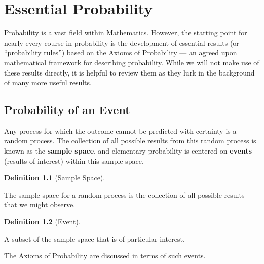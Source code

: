 \documentclass[
  letterpaper,
  DIV=11,
  numbers=noendperiod]{scrreprt}
\theoremstyle{plain}
\theoremstyle{definition}
\newtheorem{definition}{Definition}[chapter]
\theoremstyle{definition}
\theoremstyle{remark}
\begin{document}

\hypertarget{sec-fundamentals}{%
\chapter{Essential Probability}\label{sec-fundamentals}}

Probability is a vast field within Mathematics. However, the starting
point for nearly every course in probability is the development of
essential results (or ``probability rules'') based on the Axioms of
Probability --- an agreed upon mathematical framework for describing
probability. While we will not make use of these results directly, it is
helpful to review them as they lurk in the background of many more
useful results.

\hypertarget{probability-of-an-event}{%
\section{Probability of an Event}\label{probability-of-an-event}}

Any process for which the outcome cannot be predicted with certainty is
a random process. The collection of all possible results from this
random process is known as the \textbf{sample space}, and elementary
probability is centered on \textbf{events} (results of interest) within
this sample space.

\begin{definition}[Sample
Space]\protect\hypertarget{def-sample-space}{}\label{def-sample-space}

The sample space for a random process is the collection of all possible
results that we might observe.

\end{definition}

\begin{definition}[Event]\protect\hypertarget{def-event}{}\label{def-event}

A subset of the sample space that is of particular interest.

\end{definition}

The Axioms of Probability are discussed in terms of such events.
\end{document}
